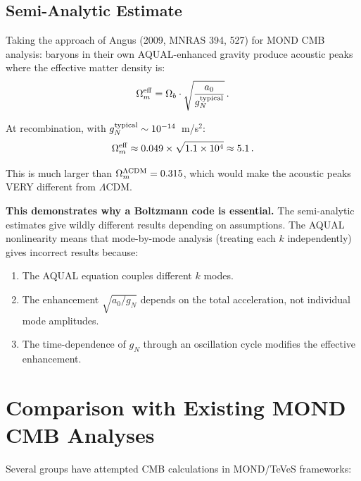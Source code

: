 \documentclass[11pt]{article}
\newcommand{\ee}[1]{\times 10^{#1}}
\newcommand{\LCDM}{$\Lambda$CDM}
\newcommand{\aM}{a_0}
\newcommand{\Ob}{\Omega_b}
\newcommand{\Om}{\Omega_m}
\begin{document}
\subsection{Semi-Analytic Estimate}

Taking the approach of Angus (2009, MNRAS 394, 527) for MOND CMB analysis:
baryons in their own AQUAL-enhanced gravity produce acoustic peaks where
the effective matter density is:
\begin{equation}
\Omega_m^{\rm eff} = \Ob\cdot\sqrt{\frac{\aM}{g_N^{\rm typical}}}\,.
\end{equation}

At recombination, with $g_N^{\rm typical} \sim 10^{-14}$~m/s$^2$:
\begin{equation}
\Omega_m^{\rm eff} \approx 0.049\times\sqrt{1.1\ee{4}} \approx 5.1\,.
\end{equation}

This is much larger than $\Om^{\Lambda\rm CDM} = 0.315$, which would
make the acoustic peaks VERY different from \LCDM.

\textbf{This demonstrates why a Boltzmann code is essential.}  The
semi-analytic estimates give wildly different results depending on
assumptions.  The AQUAL nonlinearity means that mode-by-mode analysis
(treating each $k$ independently) gives incorrect results because:
\begin{enumerate}
\item The AQUAL equation couples different $k$ modes.
\item The enhancement $\sqrt{\aM/g_N}$ depends on the total acceleration,
  not individual mode amplitudes.
\item The time-dependence of $g_N$ through an oscillation cycle modifies
  the effective enhancement.
\end{enumerate}

\section{Comparison with Existing MOND CMB Analyses}

Several groups have attempted CMB calculations in MOND/TeVeS frameworks:
\end{document}
